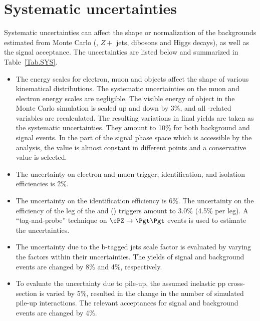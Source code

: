 \section{Systematic uncertainties}
\label{sect:sys}
Systematic uncertainties can affect the shape or normalization of the
backgrounds estimated from Monte Carlo (\ttbar, $Z+$ jets, dibosons and Higgs decays), 
as well as the signal acceptance. 
The uncertainties are listed below and summarized in Table~\ref{Tab.SYS}.


\begin{itemize}

\item  The energy scales for electron, muon and \Tau objects affect the shape of various kinematical distributions.
 The systematic uncertainties on the muon and electron energy scales are negligible.
The visible energy of \Tau object in the Monte Carlo simulation is scaled up and down
by 3\%, and all \Tau-related variables are recalculated. The resulting variations in
final yields are taken as the systematic uncertainties. They amount to 10\% for both
background and signal events. In the part of the signal phase space which is accessible by
the analysis, the value is almost constant in different points and a conservative value
is selected.


\item The uncertainty on electron and muon trigger, identification, and
  isolation efficiencies is 2\%.

\item The uncertainty on the \Tau identification efficiency is 6\%. 
  The uncertainty on the efficiency of the \Tau leg of the \eTau and
  \muTau (\tauTau) triggers amount to 3.0\% (4.5\% per leg).
  A ``tag-and-probe'' technique on $\cPZ\to \Pgt\Pgt$ events is used to estimate the 
  uncertainties.

\item The uncertainty due to the b-tagged jets scale factor is evaluated by varying the 
factors within their uncertainties. The yields of signal and background events are changed by 8\% 
and 4\%, respectively.
 
\item To evaluate the uncertainty due to pile-up, the assumed inelastic pp cross-section is
  varied by 5\%, resulted in the change in the number of simulated pile-up interactions.
 The relevant acceptances for signal and background events are changed by 4\%.



\end{itemize}

